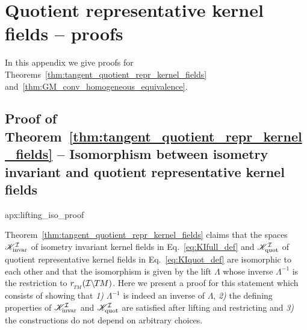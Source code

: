 

\section{Quotient representative kernel fields -- proofs}

In this appendix we give proofs for Theorems~\ref{thm:tangent_quotient_repr_kernel_fields} and~\ref{thm:GM_conv_homogeneous_equivalence}.


\toclesslab\subsection{Proof of Theorem~\ref{thm:tangent_quotient_repr_kernel_fields} -- Isomorphism between isometry invariant and quotient representative kernel fields}{apx:lifting_iso_proof}


Theorem~\ref{thm:tangent_quotient_repr_kernel_fields} claims that the spaces $\mathscr{K}_\textup{invar}^{\mathcal{I}}$ of isometry invariant kernel fields in Eq.~\eqref{eq:KIfull_def} and $\mathscr{K}_\textup{quot}^{\mathcal{I}}$ of quotient representative kernel fields in Eq.~\eqref{eq:KIquot_def} are isomorphic to each other and that the isomorphism is given by the lift $\Lambda$ whose inverse $\Lambda^{-1}$ is the restriction to $\rTM(\ITM)$.
Here we present a proof for this statement which consists of showing that
\textit{1)} $\Lambda^{-1}$ is indeed an inverse of $\Lambda$,
\textit{2)} the defining properties of $\mathscr{K}_\textup{invar}^{\mathcal{I}}$ and $\mathscr{K}_\textup{quot}^{\mathcal{I}}$ are satisfied after lifting and restricting and
\textit{3)} the constructions do not depend on arbitrary choices.



